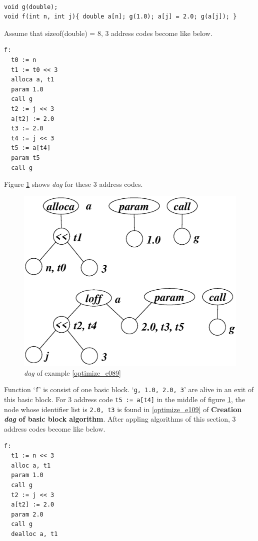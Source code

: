 \begin{Example}
\label{optimize_e089}
\begin{verbatim}

void g(double);
void f(int n, int j){ double a[n]; g(1.0); a[j] = 2.0; g(a[j]); }
\end{verbatim}
Assume that 
sizeof(double) = 8, 3 address codes become like below.
\begin{verbatim}
f:
  t0 := n
  t1 := t0 << 3
  alloca a, t1
  param 1.0
  call g
  t2 := j << 3
  a[t2] := 2.0
  t3 := 2.0
  t4 := j << 3
  t5 := a[t4]
  param t5
  call g
\end{verbatim}
Figure \ref{optimize_e090} shows {\em dag} for these 3 address codes.
\begin{figure}[htbp]
\begin{center}
\includegraphics[width=1.2\linewidth,height=1.0\linewidth]{opt038.eps}
\caption{{\em dag} of example \ref{optimize_e089}}
\label{optimize_e090}
\end{center}
\end{figure}
Function `{\tt{f}}' is consist of one basic block.
`{\tt{g, 1.0, 2.0, 3}}' are
alive in an exit of this basic block.
For 3 address code {\tt{t5 := a[t4]}} in the middle of
figure \ref{optimize_e090},
the node whose identifier list is {\tt{2.0, t3}} is found 
in \ref{optimize_e109} of {\bf Creation {\em dag} of basic block
 algorithm}.
After appling algorithms of this section,
3 address codes become like below.
\begin{verbatim}
f:
  t1 := n << 3
  alloc a, t1
  param 1.0
  call g
  t2 := j << 3
  a[t2] := 2.0
  param 2.0
  call g
  dealloc a, t1
\end{verbatim}
\end{Example}

